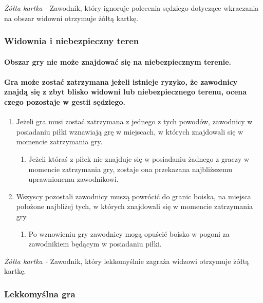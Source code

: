 \documentclass[12pt]{article}
\begin{document}
\emph{Żółta kartka} - Zawodnik, który ignoruje polecenia sędziego
dotyczące wkraczania na obszar widowni otrzymuje żółtą kartkę.

\subsubsection{Widownia i niebezpieczny teren}

\paragraph{Obszar gry nie może znajdować się na niebezpiecznym terenie.}

\paragraph{Gra może zostać zatrzymana jeżeli istnieje ryzyko, że
zawodnicy znajdą się z zbyt blisko widowni lub niebezpiecznego terenu,
ocena czego pozostaje w gestii sędziego.}

\begin{enumerate}
\item
    Jeżeli gra musi zostać zatrzymana z jednego z tych powodów, zawodnicy
  w posiadaniu piłki wznawiają grę w miejscach, w których znajdowali się
  w momencie zatrzymania gry.
  
  \begin{enumerate}
  \item
        Jeżeli któraś z piłek nie znajduje się w posiadaniu żadnego z graczy
    w momencie zatrzymania gry, zostaje ona przekazana najbliższemu
    uprawnionemu zawodnikowi.
      \end{enumerate}
\item
    Wszyscy pozostali zawodnicy muszą powrócić do granic boiska, na
  miejsca położone najbliżej tych, w których znajdowali się w momencie
  zatrzymania gry
  
  \begin{enumerate}
  \item
        Po wznowieniu gry zawodnicy mogą opuścić boisko w pogoni za
    zawodnikiem będącym w posiadaniu piłki.
      \end{enumerate}
\end{enumerate}

\emph{Żółta kartka -} Zawodnik, który lekkomyślnie zagraża widzowi
otrzymuje żółtą kartkę.

\subsubsection{Lekkomyślna gra}
\end{document}
